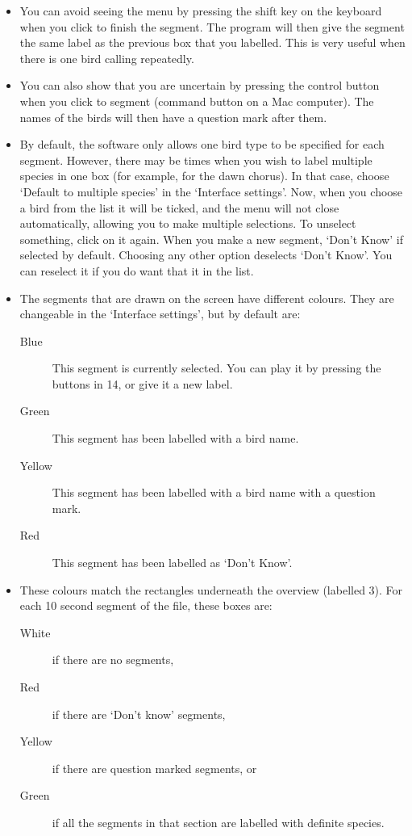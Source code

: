 \documentclass{article}
\begin{document}
\begin{itemize}
\item You can avoid seeing the menu by pressing the shift key on the keyboard when you click to finish the segment. The program will then give the segment the same label as the previous box that you labelled. This is very useful when there is one bird calling repeatedly.

\item You can also show that you are uncertain by pressing the control button when you click to segment (command button on a Mac computer). The names of the birds will then have a question mark after them. 

\item By default, the software only allows one bird type to be specified for each segment. However, there may be times when you wish to label multiple species in one box (for example, for the dawn chorus). In that case, choose `Default to multiple species' in the `Interface settings'. Now, when you choose a bird from the list it will be ticked, and the menu will not close automatically, allowing you to make multiple selections. To unselect something, click on it again. When you make a new segment, `Don't Know' if selected by default. Choosing any other option deselects `Don't Know'. You can reselect it if you do want that it in the list. 

\item The segments that are drawn on the screen have different colours. They are changeable in the `Interface settings', but by default are:
	\begin{description} 
	\item[Blue] This segment is currently selected. You can play it by pressing the buttons in 14, or give it a new label. 
	\item[Green] This segment has been labelled with a bird name.
	\item[Yellow] This segment has been labelled with a bird name with a question mark.
	\item[Red] This segment has been labelled as `Don't Know'.
	\end{description}

\item These colours match the rectangles underneath the overview (labelled 3). For each 10 second segment of the file, these boxes are:

	\begin{description} 
 	\item[White] if there are no segments, 
	\item[Red] if there are `Don't know' segments, 
	\item[Yellow] if there are question marked segments, or 
	\item[Green] if all the segments in that section are labelled with definite species. 
	\end{description}
	

\end{itemize}
\end{document}
